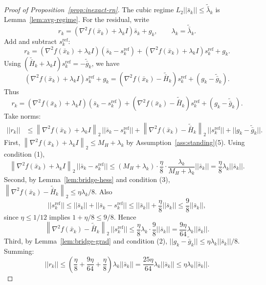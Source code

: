 \documentclass[11pt,a4paper]{article}
\def\norm#1{||#1||}%
\newcommand{\norm}[1]{\left\|#1\right\|}
\newcommand{\normtwo}[1]{\left\|#1\right\|_2}
\begin{document}
	\begin{proof}[Proof of Proposition~\ref{prop:inexact-rn}]
		The cubic regime $L_2\norm{\bar s_k}\le \tilde{\bar\lambda}_k$ is Lemma~\ref{lem:avg-regime}.
		For the residual, write
		\[
		r_k=(\nabla^2 f(\bar x_k)+\lambda_k I)\bar s_k+g_k,\qquad \lambda_k=\tilde{\bar\lambda}_k.
		\]
		Add and subtract $s_k^{\mathrm{ref}}$:
		\[
		r_k=(\nabla^2 f(\bar x_k)+\lambda_k I)(\bar s_k-s_k^{\mathrm{ref}})
		+(\nabla^2 f(\bar x_k)+\lambda_k I)s_k^{\mathrm{ref}}+g_k.
		\]
		Using $(\tilde{\bar H}_k+\lambda_k I)s_k^{\mathrm{ref}}=-\tilde{\bar g}_k$, we have
		\[
		(\nabla^2 f(\bar x_k)+\lambda_k I)s_k^{\mathrm{ref}}+g_k
		=(\nabla^2 f(\bar x_k)-\tilde{\bar H}_k)s_k^{\mathrm{ref}}+(g_k-\tilde{\bar g}_k).
		\]
		Thus
		\[
		r_k=(\nabla^2 f(\bar x_k)+\lambda_k I)(\bar s_k-s_k^{\mathrm{ref}})
		+(\nabla^2 f(\bar x_k)-\tilde{\bar H}_k)s_k^{\mathrm{ref}}+(g_k-\tilde{\bar g}_k).
		\]
		Take norms:
		\begin{align*}
			\norm{r_k}
			&\le \normtwo{\nabla^2 f(\bar x_k)+\lambda_k I}\,\norm{\bar s_k-s_k^{\mathrm{ref}}}
			+\normtwo{\nabla^2 f(\bar x_k)-\tilde{\bar H}_k}\,\norm{s_k^{\mathrm{ref}}}
			+\norm{g_k-\tilde{\bar g}_k}.
		\end{align*}
		First, $\normtwo{\nabla^2 f(\bar x_k)+\lambda_k I}\le M_H+\lambda_k$ by Assumption~\ref{ass:standing}(5).
		Using condition (1),
		\[
		\normtwo{\nabla^2 f(\bar x_k)+\lambda_k I}\,\norm{\bar s_k-s_k^{\mathrm{ref}}}
		\le (M_H+\lambda_k)\cdot \frac{\eta}{8}\cdot\frac{\lambda_k}{M_H+\lambda_k}\norm{\bar s_k}
		=\frac{\eta}{8}\lambda_k\norm{\bar s_k}.
		\]
		Second, by Lemma~\ref{lem:bridge-hess} and condition (3),
		$\normtwo{\nabla^2 f(\bar x_k)-\tilde{\bar H}_k}\le \eta\lambda_k/8$.
		Also
		\[
		\norm{s_k^{\mathrm{ref}}}\le \norm{\bar s_k}+\norm{\bar s_k-s_k^{\mathrm{ref}}}
		\le \norm{\bar s_k}+\frac{\eta}{8}\norm{\bar s_k}
		\le \frac98\norm{\bar s_k},
		\]
		since $\eta\le 1/12$ implies $1+\eta/8\le 9/8$.
		Hence
		\[
		\normtwo{\nabla^2 f(\bar x_k)-\tilde{\bar H}_k}\,\norm{s_k^{\mathrm{ref}}}
		\le \frac{\eta}{8}\lambda_k\cdot \frac98\norm{\bar s_k}=\frac{9\eta}{64}\lambda_k\norm{\bar s_k}.
		\]
		Third, by Lemma~\ref{lem:bridge-grad} and condition (2),
		$\norm{g_k-\tilde{\bar g}_k}\le \eta\lambda_k\norm{\bar s_k}/8$.
		Summing:
		\[
\norm{r_k}\le \left(\frac{\eta}{8}+\frac{9\eta}{64}+\frac{\eta}{8}\right)\lambda_k\norm{\bar s_k}
=\frac{25\eta}{64}\lambda_k\norm{\bar s_k}\le \eta\lambda_k\norm{\bar s_k}.
		\]
	\end{proof}
	
\end{document}

